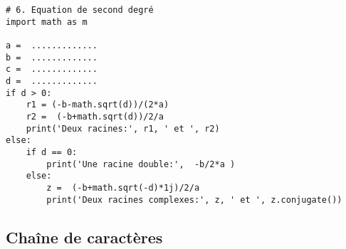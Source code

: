 \documentclass[a4paper]{article}
\begin{document}
\begin{enumerate}
\begin{lstlisting}
# 6. Equation de second degré
import math as m

a =  .............
b =  .............
c =  .............
d =  .............
if d > 0:
    r1 = (-b-math.sqrt(d))/(2*a)
    r2 =  (-b+math.sqrt(d))/2/a
    print('Deux racines:', r1, ' et ', r2)
else:
    if d == 0:
        print('Une racine double:',  -b/2*a )
    else:
        z =  (-b+math.sqrt(-d)*1j)/2/a
        print('Deux racines complexes:', z, ' et ', z.conjugate())
\end{lstlisting}

 \end{enumerate}
\subsection{Chaîne de caractères}
\end{document}
